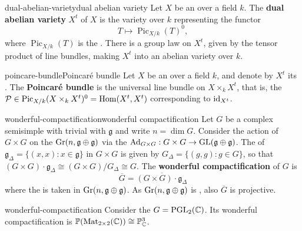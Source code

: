 \begin{topic}{dual-abelian-variety}{dual abelian variety}
    Let $X$ be an  over a field $k$. The \textbf{dual abelian variety} $X^t$ of $X$ is the variety over $k$ representing the functor
    \[ T \mapsto \operatorname{Pic}_{X/k}(T)^0 , \]
    where $\operatorname{Pic}_{X/k}(T)$ is the . There is a group law on $X^t$, given by the tensor product of line bundles, making $X^t$ into an abelian variety over $k$.
\end{topic}

\begin{topic}{poincare-bundle}{Poincaré bundle}
    Let $X$ be an  over a field $k$, and denote by $X^t$ its . The \textbf{Poincaré bundle} is the universal line bundle on $X \times_k X^t$, that is, the  $\mathcal{P} \in \operatorname{Pic}_{X/k}(X \times_k X^t)^0 = \operatorname{Hom}(X^t, X^t)$ corresponding to $\textup{id}_{X^t}$.
\end{topic}

\begin{topic}{wonderful-compactification}{wonderful compactification}
    Let $G$ be a complex  semisimple  with trivial  with  $\mathfrak{g}$ and write $n = \dim G$. Consider the action of $G \times G$ on the  $\textup{Gr}(n, \mathfrak{g} \oplus \mathfrak{g})$ via the  $\textup{Ad}_{G \times G} : G \times G \to \textup{GL}(\mathfrak{g} \oplus \mathfrak{g})$. The  of $\mathfrak{g}_\Delta = \{ (x, x) : x \in \mathfrak{g} \}$ in $G \times G$ is given by $G_\Delta = \{ (g, g) : g \in G \}$, so that $(G \times G) \cdot \mathfrak{g}_\Delta \cong (G \times G) / G_\Delta \cong G$.
    The \textbf{wonderful compactification} of $G$ is
    \[ \overline{G} = \overline{(G \times G) \cdot \mathfrak{g}_\Delta} \]
    where the  is taken in $\textup{Gr}(n, \mathfrak{g} \oplus \mathfrak{g})$. As $\textup{Gr}(n, \mathfrak{g} \oplus \mathfrak{g})$ is , also $\overline{G}$ is projective.
\end{topic}

\begin{example}{wonderful-compactification}
    Consider the  $G = \textup{PGL}_2(\mathbb{C})$. Its wonderful compactification is $\mathbb{P}(\textup{Mat}_{2 \times 2}(\mathbb{C})) \cong \mathbb{P}^3_{\mathbb{C}}$.
\end{example}
